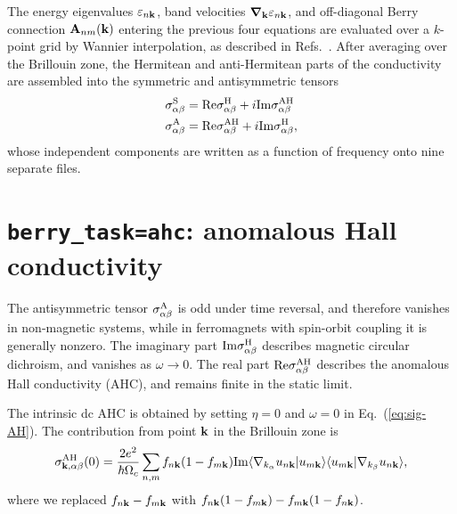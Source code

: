 The energy eigenvalues $\varepsilon_{n\bf k}$, band velocities
$\bm{\nabla}_{\bf k}\varepsilon_{n{\bf k}}$, and off-diagonal Berry
connection ${\bf A}_{nm}({\bf k})$ entering the previous four
equations are evaluated over a $k$-point grid by Wannier
interpolation, as described in Refs.~\cite{wang-prb06,yates-prb07}.
After averaging over the Brillouin zone, the Hermitean and
anti-Hermitean parts of the conductivity are assembled into the
symmetric and antisymmetric tensors
%
\begin{align}
\sigma^{\rm S}_{\alpha\beta}&=
{\rm Re}\sigma^{\rm H}_{\alpha\beta}+i{\rm Im}\sigma^{\rm AH}_{\alpha\beta}\\
\sigma^{\rm A}_{\alpha\beta}&=
{\rm Re}\sigma^{\rm AH}_{\alpha\beta}+i{\rm Im}\sigma^{\rm H}_{\alpha\beta},
\end{align}
%
whose independent components are written as a function of frequency
onto nine separate files.

\section{{\tt berry\_task=ahc}: anomalous Hall conductivity}
\label{sec:ahc}

The antisymmetric tensor $\sigma^{\rm A}_{\alpha\beta}$ is odd under
time reversal, and therefore vanishes in non-magnetic systems, while
in ferromagnets with spin-orbit coupling it is generally nonzero.  The
imaginary part ${\rm Im}\sigma^{\rm H}_{\alpha\beta}$ describes
magnetic circular dichroism, and vanishes as $\omega\rightarrow
0$. The real part ${\rm Re}\sigma^{\rm AH}_{\alpha\beta}$ describes
the anomalous Hall conductivity (AHC), and remains finite in the
static limit.

The intrinsic dc AHC is obtained by setting $\eta=0$ and $\omega=0$ in
Eq.~(\ref{eq:sig-AH}). The contribution from point ${\bf k}$ in the
Brillouin zone is
%
\begin{equation}
\sigma^{\rm AH}_{{\bf k},\alpha\beta}(0)=\frac{2e^2}{\hbar\Omega_c}
\sum_{n,m}f_{n\bf k}(1-f_{m\bf k})
{\rm Im}\langle \nabla_{k_\alpha} u_{n\bf k}\vert u_{m\bf k}\rangle
\langle u_{m\bf k}\vert\nabla_{k_\beta} u_{n\bf k}\rangle,
\end{equation}
%
where we replaced $f_{n\bf k}-f_{m\bf k}$ with 
$f_{n\bf k}(1-f_{m\bf k})-f_{m\bf k}(1-f_{n\bf k})$.

